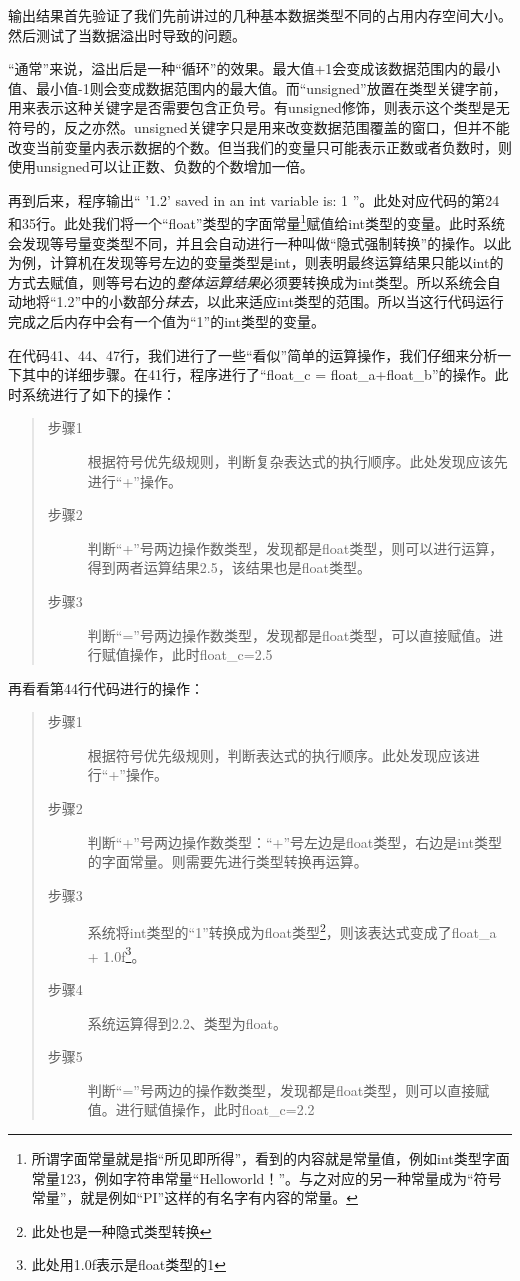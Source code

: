 输出结果首先验证了我们先前讲过的几种基本数据类型不同的占用内存空间大小。然后测试了当数据溢出时导致的问题。

“通常”来说，溢出后是一种“循环”的效果。最大值+1会变成该数据范围内的最小值、最小值-1则会变成数据范围内的最大值。而“unsigned”放置在类型关键字前，用来表示这种关键字是否需要包含正负号。有unsigned修饰，则表示这个类型是无符号的，反之亦然。unsigned关键字只是用来改变数据范围覆盖的窗口，但并不能改变当前变量内表示数据的个数。但当我们的变量只可能表示正数或者负数时，则使用unsigned可以让正数、负数的个数增加一倍。

再到后来，程序输出“ '1.2' saved in an int variable is: 1 ”。此处对应代码的第24和35行。此处我们将一个“float”类型的字面常量\footnote{所谓字面常量就是指“所见即所得”，看到的内容就是常量值，例如int类型字面常量123，例如字符串常量“Helloworld！”。与之对应的另一种常量成为“符号常量”，就是例如“PI”这样的有名字有内容的常量。}赋值给int类型的变量。此时系统会发现等号量变类型不同，并且会自动进行一种叫做“隐式强制转换”的操作。以此为例，计算机在发现等号左边的变量类型是int，则表明最终运算结果只能以int的方式去赋值，则等号右边的\emph{整体运算结果}必须要转换成为int类型。所以系统会自动地将“1.2”中的小数部分\emph{抹去}，以此来适应int类型的范围。所以当这行代码运行完成之后内存中会有一个值为“1”的int类型的变量。

在代码41、44、47行，我们进行了一些“看似”简单的运算操作，我们仔细来分析一下其中的详细步骤。在41行，程序进行了“float\_c = float\_a+float\_b”的操作。此时系统进行了如下的操作：
\begin{quote}
	\begin{description}
		\item[步骤1] 根据符号优先级规则，判断复杂表达式的执行顺序。此处发现应该先进行“+”操作。
		\item[步骤2] 判断“+”号两边操作数类型，发现都是float类型，则可以进行运算，得到两者运算结果2.5，该结果也是float类型。
		\item[步骤3] 判断“=”号两边操作数类型，发现都是float类型，可以直接赋值。进行赋值操作，此时float\_c=2.5
	\end{description}
\end{quote}

再看看第44行代码进行的操作：
\begin{quote}
	\begin{description}
		\item[步骤1] 根据符号优先级规则，判断表达式的执行顺序。此处发现应该进行“+”操作。
		\item[步骤2] 判断“+”号两边操作数类型：“+”号左边是float类型，右边是int类型的字面常量。则需要先进行类型转换再运算。
		\item[步骤3] 系统将int类型的“1”转换成为float类型\footnote{此处也是一种隐式类型转换}，则该表达式变成了float\_a + 1.0f\footnote{此处用1.0f表示是float类型的1}。
		\item[步骤4] 系统运算得到2.2、类型为float。
		\item[步骤5] 判断“=”号两边的操作数类型，发现都是float类型，则可以直接赋值。进行赋值操作，此时float\_c=2.2
	\end{description}
\end{quote}

